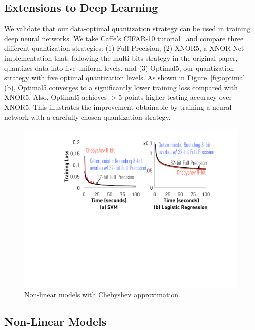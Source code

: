 \documentclass{article}
\begin{document}
\vspace{-1em}
\subsection{Extensions to Deep Learning}
\vspace{-0.5em}

We validate that our data-optimal quantization
strategy can be used in training deep neural
networks. We take Caffe's CIFAR-10 tutorial~\cite{Caffe:CIFAR10}
and compare three different quantization
strategies: (1) Full Precision, (2) XNOR5, 
a XNOR-Net implementation that, following
the multi-bits strategy in
the original paper, quantizes data into
five uniform levels, and (3)
Optimal5, our quantization strategy with
five optimal quantization levels. As
shown in Figure~\ref{fig:optimal}(b), Optimal5
converges to a significantly lower training 
loss compared with XNOR5. Also,
Optimal5 achieves $>$5 points higher testing accuracy over XNOR5.
This illustrates the improvement
obtainable by training a neural network with
a carefully chosen quantization strategy.



\begin{figure}[t]
\centering
\includegraphics[width=0.7\columnwidth]{final-experiments/chebyshev} 
\vspace{-1.2em}
\caption{Non-linear models with Chebyshev approximation.}
\vspace{-1.9em}
\label{fig:chebyshev}
\end{figure}

\vspace{-1em}
\subsection{Non-Linear Models}
\vspace{-0.5em}
\end{document}
